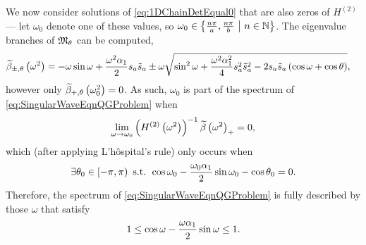 We now consider solutions of \eqref{eq:1DChainDetEqual0} that are also zeros of $H^{(2)}$ --- let $\omega_0$ denote one of these values, so $\omega_0\in\left\{ \frac{n\pi}{a}, \frac{n\pi}{b} \ \middle\vert \  n\in\mathbb{N}  \right\}$.
The eigenvalue branches of $\mathfrak{M}_{\theta}$ can be computed,
\begin{align*}
	\widetilde{\beta}_{\pm, \theta}\left( \omega^2 \right) &= -\omega\sin\omega + \frac{\omega^2\alpha_1}{2}s_a \tilde{s}_a \pm \omega\sqrt{ \sin^2\omega + \frac{\omega^2\alpha_1^2}{4}s_a^2 \tilde{s}_a^2 - 2s_a \tilde{s}_a\left( \cos\omega+\cos\theta \right) },
\end{align*}
however only $\widetilde{\beta}_{+, \theta}\left( \omega_0^2 \right)=0$.
As such, $\omega_0$ is part of the spectrum of \eqref{eq:SingularWaveEqnQGProblem} when
\begin{align*}
	\lim_{\omega\rightarrow\omega_0}\left(  H^{(2)}\left( \omega^2 \right)  \right)^{-1}\widetilde{\beta}\left( \omega^2 \right)_{+} = 0,
\end{align*}
which (after applying L'h\^ospital's rule) only occurs when
\begin{align*}
	\exists\theta_0\in\left[-\pi,\pi\right) \text{ s.t. } \cos\omega_0 - \frac{\omega_0\alpha_1}{2}\sin\omega_0 - \cos\theta_0 = 0. 
\end{align*}
Therefore, the spectrum of \eqref{eq:SingularWaveEqnQGProblem} is fully described by those $\omega$ that satisfy
\begin{align*}
	\-1 \leq \cos\omega - \frac{\omega\alpha_1}{2}\sin\omega \leq 1.
\end{align*}

